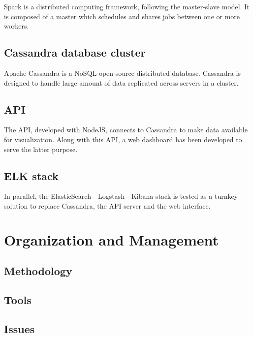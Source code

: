 \documentclass[11pt]{article}
\begin{document}
Spark is a distributed computing framework, following the master-slave model. It is composed of a master which schedules and shares jobs between one or more workers.

\subsection{Cassandra database cluster}

Apache Cassandra is a NoSQL open-source distributed database. Cassandra is designed to handle large amount of data replicated across servers in a cluster.

\subsection{API}

The API, developed with NodeJS, connects to Cassandra to make data available for visualization. Along with this API, a web dashboard has been developed to serve the latter purpose.

\subsection{ELK stack}

In parallel, the ElasticSearch - Logstash - Kibana stack is tested as a turnkey solution to replace Cassandra, the API server and the web interface. %

\section{Organization and Management}

\subsection{Methodology}


\subsection{Tools}


\subsection{Issues}
\end{document}
